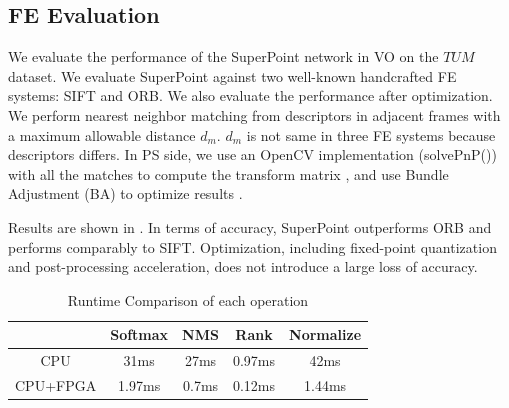 

\subsection{ FE Evaluation }

We evaluate the performance of the SuperPoint network in VO on the $TUM$ dataset\cite{sturm12iros}. We evaluate SuperPoint against two well-known handcrafted FE systems: SIFT\cite{Lowe-478} and ORB\cite{Mur-Artal:2017281}. 
We also evaluate the performance after optimization. 
We perform nearest neighbor matching from descriptors in adjacent frames with a maximum allowable distance $d_m$. $d_m$ is not same in three FE systems because descriptors differs. In PS side, we use an OpenCV implementation (solvePnP()) with all the matches to compute the transform matrix \cite{LepetitMoreno-Noguer-EPnP}, and use Bundle Adjustment (BA) to optimize results \cite{TriggsMclauchlan-Bundle-Adjustment}. 

Results are shown in . In terms of accuracy, SuperPoint outperforms ORB and performs comparably to SIFT. Optimization, including fixed-point quantization and post-processing acceleration, does not introduce a large loss of accuracy. 

\begin{table}[t]
  \centering
  \setlength{\abovecaptionskip}{2pt}
  \caption{Runtime Comparison of each operation}
\begin{tabular}{|c|c|c|c|c|}
  \hline
             &    Softmax &        NMS &       Rank &  Normalize \\
  \hline
         CPU &       31ms &       27ms &       0.97ms &       42ms \\
  \hline
    CPU+FPGA &     1.97ms &      0.7ms &     0.12ms &     1.44ms \\
  \hline
  \end{tabular}  
  
  \label{tab:optimization}%
\end{table}%

